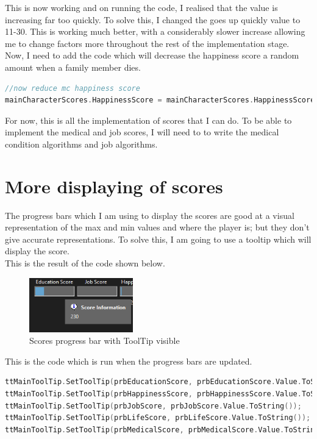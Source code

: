 This is now working and on running the code, I realised that the value is increasing far too quickly. To solve this, I changed the goes up quickly value to 11-30. This is working much better, with a considerably slower increase allowing me to change factors more throughout the rest of the implementation stage.\\
Now, I need to add the code which will decrease the happiness score a random amount when a family member dies.
\begin{lstlisting}[language=c, style=csharp, caption=Code to reduce the main character happiness score once a family member has died]
//now reduce mc happiness score
mainCharacterScores.HappinessScore = mainCharacterScores.HappinessScore - randomNumber(1, 100);
\end{lstlisting}
For now, this is all the implementation of scores that I can do. To be able to implement the medical and job scores, I will need to to write the medical condition algorithms and job algorithms.

\section{More displaying of scores}
The progress bars which I am using to display the scores are good at a visual representation of the max and min values and where the player is; but they don't give accurate representations. To solve this, I am going to use a tooltip which will display the score.\\
This is the result of the code shown below.
\begin{figure}[H]
    \centering
    \includegraphics[width=0.4\textwidth]{images/implementation/scoresDisplay1.png}
    \caption{Scores progress bar with ToolTip visible}
    \label{fig:implementation-scoresDisplay1}
\end{figure}
This is the code which is run when the progress bars are updated.
\begin{lstlisting}[language=c, style=csharp, caption=Code to populate ToolTips showing score information]
ttMainToolTip.SetToolTip(prbEducationScore, prbEducationScore.Value.ToString());
ttMainToolTip.SetToolTip(prbHappinessScore, prbHappinessScore.Value.ToString());
ttMainToolTip.SetToolTip(prbJobScore, prbJobScore.Value.ToString());
ttMainToolTip.SetToolTip(prbLifeScore, prbLifeScore.Value.ToString());
ttMainToolTip.SetToolTip(prbMedicalScore, prbMedicalScore.Value.ToString());
\end{lstlisting}

